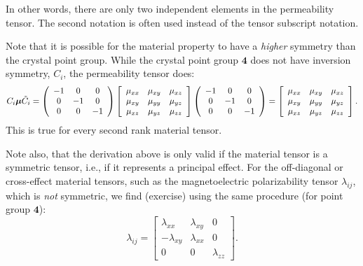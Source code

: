 In other words, there are only two independent elements in the permeability tensor.  The second notation is often used instead of the tensor subscript notation.

Note that it is possible for the material property to have a \textit{higher} symmetry than the crystal point group.  While the crystal point group $\textbf{4}$ does not have inversion symmetry, $C_i$, the permeability tensor does:
{\small\begin{equation}
C_i\bm{\mu}\tilde{C}_i = \left(\begin{array}{ccc} -1 & 0 & 0 \\ 0 & -1 & 0 \\ 0 & 0 & -1\end{array}\right)
	\left[\begin{array}{ccc} \mu_{xx} & \mu_{xy} & \mu_{xz} \\ \mu_{xy} & \mu_{yy} & \mu_{yz} \\ \mu_{xz} & \mu_{yz} & \mu_{zz}\end{array}\right]\left(\begin{array}{ccc} -1 & 0 & 0 \\ 0 & -1 & 0 \\ 0 & 0 & -1\end{array}\right) = 
	\left[\begin{array}{ccc} \mu_{xx} & \mu_{xy} & \mu_{xz} \\ \mu_{xy} & \mu_{yy} & \mu_{yz} \\ \mu_{xz} & \mu_{yz} & \mu_{zz}\end{array}\right].
\end{equation}}
This is true for every second rank material tensor.

Note also, that the derivation above is only valid if the material tensor is a symmetric tensor, i.e., if it represents a principal effect.   For the off-diagonal or cross-effect material tensors, such as the magnetoelectric polarizability tensor $\lambda_{ij}$, which is \textit{not} symmetric, we find (exercise) using the same procedure (for point group $\textbf{4}$):
\begin{equation}
	\lambda_{ij} =  \left[\begin{array}{ccc} 
	\lambda_{xx} & \lambda_{xy} & 0 \\ 
	-\lambda_{xy} &  \lambda_{xx} & 0 \\ 
	0 & 0 & \lambda_{zz}\end{array}\right].
\end{equation}

